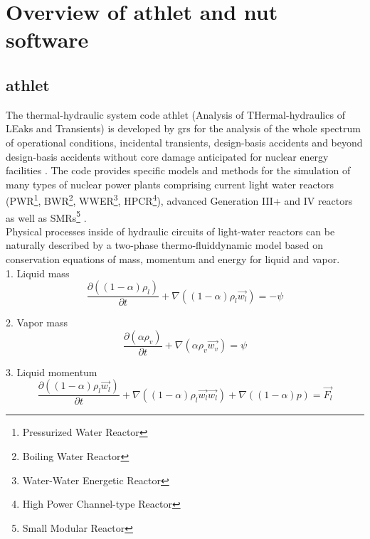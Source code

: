 \chapter{Overview of \gls{athlet} and \gls{nut} software}\label{chapter:athlet-nut}

\section{\gls{athlet}}
\label{sec:athlet-overview}


The thermal-hydraulic system code \gls{athlet} (Analysis of THermal-hydraulics of LEaks and Transients) is developed by \gls{grs} for the analysis of the whole spectrum of operational conditions, incidental transients, design-basis accidents and beyond design-basis accidents without core damage anticipated for nuclear energy facilities \cite{grs:athlet-info}. The code provides specific models and methods for the simulation of many types of nuclear power plants comprising current light water reactors (PWR\footnote{Pressurized Water Reactor}, BWR\footnote{Boiling Water Reactor}, WWER\footnote{Water-Water Energetic Reactor}, HPCR\footnote{High Power Channel-type Reactor}), advanced Generation III+ and IV reactors as well as SMRs\footnote{Small Modular Reactor} \cite{grs:athlet-info}.\\


Physical processes inside of hydraulic circuits of light-water reactors can be naturally described by a two-phase thermo-fluiddynamic model based on conservation equations of mass, momentum and energy for liquid and vapor.\\

1. Liquid mass
\begin{equation} \label{eq:athlet-1}
\frac{\partial ((1-\alpha)\rho_{l})}{\partial t} + \nabla ((1-\alpha) \rho_{l} \vec{w_{l}}) = - \psi
\end{equation}


2. Vapor mass
\begin{equation} \label{eq:athlet-2}
\frac{\partial (\alpha \rho_{v})}{\partial t} + \nabla (\alpha \rho_{v} \vec{w_{v}}) = \psi
\end{equation}


3. Liquid momentum
\begin{equation} \label{eq:athlet-3}
\frac{\partial ((1-\alpha) \rho_{l} \vec{w_{l}})}{\partial t} + \nabla ((1-\alpha) \rho_{l} \vec{w_{l}} \vec{w_{l}}) + \nabla ((1 - \alpha)p) = \vec{F_{l}}
\end{equation}



